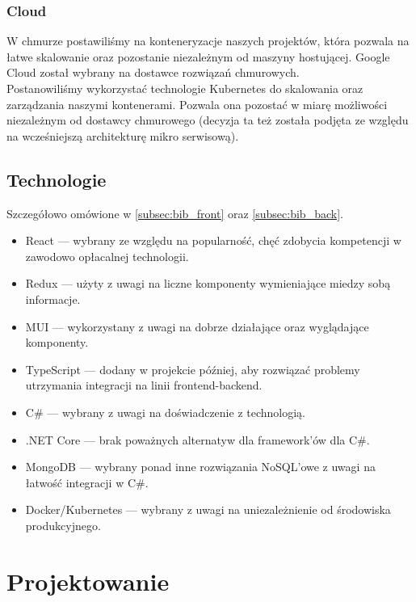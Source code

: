 \documentclass[a4paper,11pt]{report}
\begin{document}
\subsection{Cloud}
W chmurze postawiliśmy na konteneryzacje naszych projektów, która pozwala na łatwe
skalowanie oraz pozostanie niezależnym od maszyny hostującej. Google Cloud został wybrany na dostawce rozwiązań chmurowych.\\
Postanowiliśmy wykorzystać technologie Kubernetes do skalowania oraz zarządzania naszymi kontenerami. Pozwala ona pozostać w miarę możliwości
niezależnym od dostawcy chmurowego (decyzja ta też została podjęta ze względu na wcześniejszą architekturę mikro serwisową).
\section{Technologie}
Szczegółowo omówione w \ref{subsec:bib_front} oraz \ref{subsec:bib_back}.
		\begin{itemize}
			\item React — wybrany ze względu na popularność, chęć zdobycia kompetencji w zawodowo opłacalnej technologii.
			\item Redux — użyty z uwagi na liczne komponenty wymieniające miedzy sobą informacje.
			\item MUI — wykorzystany z uwagi na dobrze działające oraz wyglądające komponenty. 
			\item TypeScript — dodany w projekcie później, aby rozwiązać problemy utrzymania integracji na linii frontend-backend.
			\item C\# — wybrany z uwagi na doświadczenie z technologią.
			\item .NET Core — brak poważnych alternatyw dla framework'ów dla C\#.
			\item MongoDB — wybrany ponad inne rozwiązania NoSQL'owe z uwagi na łatwość integracji w C\#.
			\item Docker/Kubernetes — wybrany z uwagi na uniezależnienie od środowiska produkcyjnego.
		\end{itemize}

\chapter {Projektowanie}
\end{document}
